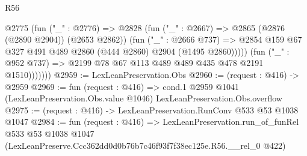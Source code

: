 \begin{lexlean}{R56}
\begin{coremodule}
                  @2775
                    (fun ("_" : @2776) =>
                    @2828
                      (fun ("_" : @2667) => @2865 (@2876 (@2890 @2904)) (@2653 @2862))
                      (fun ("_" : @2666 @737) =>
                      @2854 @159 @67 @327 @491 @489 @2860 (@444 @2860) @2904 (@1495 @2860)))))
                (fun ("_" : @952 @737) => @2199 @78 @67 @113 @489 @489 @435 @478 @2191 @1510)))))))
@2959 := LexLeanPreservation.Obs
@2960 := (request : @416) -> @2959
@2969 := fun (request : @416) =>
  cond.{1} @2959 @1041 (LexLeanPreservation.Obs.value @1046) LexLeanPreservation.Obs.overflow
@2975 := (request : @416) -> LexLeanPreservation.RunConv @533 @53 @1038 @1047
@2984 := fun (request : @416) =>
  LexLeanPreservation.run_of_funRel
    @533
    @53
    @1038
    @1047
    (LexLeanPreserve.Ccc362dd0d0b76b7c46f93f7f38ec125e.R56.__rel_0 @422)
\end{coremodule}
\end{lexlean}
